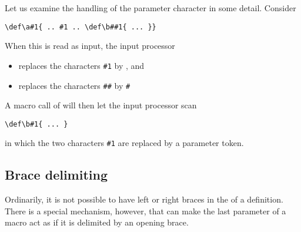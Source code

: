 \documentclass[letterpaper]{book}
\begin{document}
Let us examine the handling of the parameter character
in some detail.
Consider
\begin{verbatim}
\def\a#1{ .. #1 .. \def\b##1{ ... }}
\end{verbatim}
When this is read as input, the input processor
\begin{itemize}
\item replaces the characters \verb>#1> by , and
\item replaces the characters \verb>##> by \verb>#>\end{itemize}
A macro call of  will then let the input processor scan
\begin{verbatim}
\def\b#1{ ... }
\end{verbatim}
in which the two characters \verb>#1> are
\alt
replaced by a parameter token.

\subsection{Brace delimiting}

Ordinarily, it is not possible to have left or right
braces in the  of a definition.
There is a special mechanism, however, that can make
the last parameter of a macro act as if it is delimited
by an opening brace. 
\end{document}
